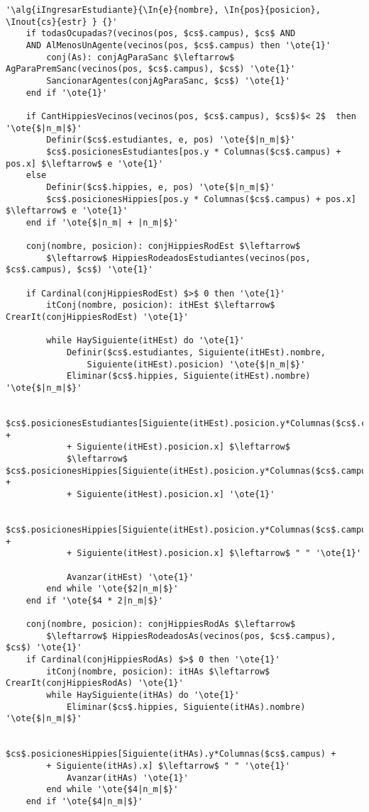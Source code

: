 \begin{lstlisting}[mathescape]
'\alg{iIngresarEstudiante}{\In{e}{nombre}, \In{pos}{posicion}, \Inout{cs}{estr} } {}'
	if todasOcupadas?(vecinos(pos, $cs$.campus), $cs$ AND
	AND AlMenosUnAgente(vecinos(pos, $cs$.campus) then '\ote{1}'
		conj(As): conjAgParaSanc $\leftarrow$ AgParaPremSanc(vecinos(pos, $cs$.campus), $cs$) '\ote{1}'
		SancionarAgentes(conjAgParaSanc, $cs$) '\ote{1}'
	end if '\ote{1}'

	if CantHippiesVecinos(vecinos(pos, $cs$.campus), $cs$)$< 2$  then '\ote{$|n_m|$}'
		Definir($cs$.estudiantes, e, pos) '\ote{$|n_m|$}'
		$cs$.posicionesEstudiantes[pos.y * Columnas($cs$.campus) + pos.x] $\leftarrow$ e '\ote{1}'
	else
		Definir($cs$.hippies, e, pos) '\ote{$|n_m|$}'
		$cs$.posicionesHippies[pos.y * Columnas($cs$.campus) + pos.x] $\leftarrow$ e '\ote{1}'
	end if '\ote{$|n_m| + |n_m|$}'

	conj(nombre, posicion): conjHippiesRodEst $\leftarrow$
		$\leftarrow$ HippiesRodeadosEstudiantes(vecinos(pos, $cs$.campus), $cs$) '\ote{1}'

	if Cardinal(conjHippiesRodEst) $>$ 0 then '\ote{1}'
		itConj(nombre, posicion): itHEst $\leftarrow$ CrearIt(conjHippiesRodEst) '\ote{1}'

		while HaySiguiente(itHEst) do '\ote{1}'
			Definir($cs$.estudiantes, Siguiente(itHEst).nombre,
				Siguiente(itHEst).posicion) '\ote{$|n_m|$}'
			Eliminar($cs$.hippies, Siguiente(itHEst).nombre) '\ote{$|n_m|$}'

			$cs$.posicionesEstudiantes[Siguiente(itHEst).posicion.y*Columnas($cs$.campus) +
			+ Siguiente(itHEst).posicion.x] $\leftarrow$
			$\leftarrow$ $cs$.posicionesHippies[Siguiente(itHEst).posicion.y*Columnas($cs$.campus) +
			+ Siguiente(itHest).posicion.x] '\ote{1}'

			$cs$.posicionesHippies[Siguiente(itHEst).posicion.y*Columnas($cs$.campus) +
			+ Siguiente(itHest).posicion.x] $\leftarrow$ " " '\ote{1}'

			Avanzar(itHEst) '\ote{1}'
		end while '\ote{$2|n_m|$}'
	end if '\ote{$4 * 2|n_m|$}'

	conj(nombre, posicion): conjHippiesRodAs $\leftarrow$
		$\leftarrow$ HippiesRodeadosAs(vecinos(pos, $cs$.campus), $cs$) '\ote{1}'
	if Cardinal(conjHippiesRodAs) $>$ 0 then '\ote{1}'
		itConj(nombre, posicion): itHAs $\leftarrow$ CrearIt(conjHippiesRodAs) '\ote{1}'
		while HaySiguiente(itHAs) do '\ote{1}'
			Eliminar($cs$.hippies, Siguiente(itHAs).nombre) '\ote{$|n_m|$}'

			$cs$.posicionesHippies[Siguiente(itHAs).y*Columnas($cs$.campus) +
		+ Siguiente(itHAs).x] $\leftarrow$ " " '\ote{1}'
			Avanzar(itHAs) '\ote{1}'
		end while '\ote{$4|n_m|$}'
	end if '\ote{$4|n_m|$}'


\end{lstlisting}
